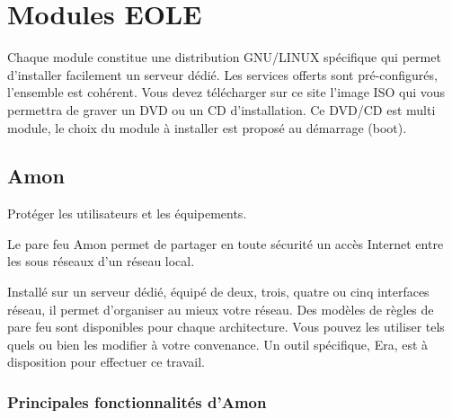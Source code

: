 \section{Modules EOLE}\label{modules eole}

Chaque module constitue une distribution GNU/LINUX spécifique qui permet
d’installer facilement un serveur dédié. Les services offerts sont
pré-configurés, l’ensemble est cohérent. Vous devez télécharger sur ce site
l’image ISO qui vous permettra de graver un DVD ou un CD d’installation. Ce
DVD/CD est multi module, le choix du module à installer est proposé au
démarrage (boot). 

\subsection{Amon}

Protéger les utilisateurs et les équipements.

Le pare feu Amon permet de partager en toute sécurité un accès Internet 
entre les sous réseaux d'un réseau local.

Installé sur un serveur dédié, équipé de deux, trois, quatre ou cinq 
interfaces réseau, il permet d'organiser au mieux votre réseau.
Des modèles de règles de pare feu sont disponibles pour chaque architecture.
Vous pouvez les utiliser tels quels ou bien les modifier à votre convenance. 
Un outil spécifique, Era, est à disposition pour effectuer ce travail.

\subsubsection{Principales fonctionnalités d'Amon}


